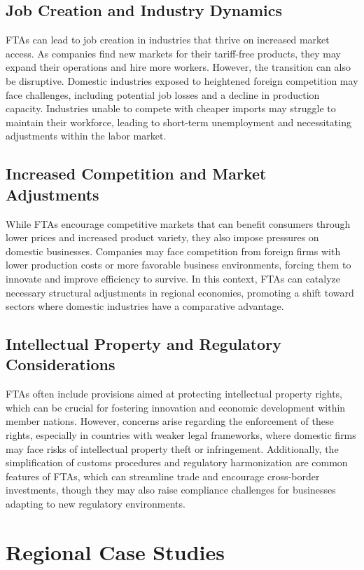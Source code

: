 \documentclass[12pt]{article}
\begin{document}
\subsection{Job Creation and Industry Dynamics}
FTAs can lead to job creation in industries that thrive on increased market access. As companies find new markets for their tariff-free products, they may expand their operations and hire more workers.  However, the transition can also be disruptive. Domestic industries exposed to heightened foreign competition may face challenges, including potential job losses and a decline in production capacity. Industries unable to compete with cheaper imports may struggle to maintain their workforce, leading to short-term unemployment and necessitating adjustments within the labor market.

\subsection{Increased Competition and Market Adjustments}
While FTAs encourage competitive markets that can benefit consumers through lower prices and increased product variety, they also impose pressures on domestic businesses. Companies may face competition from foreign firms with lower production costs or more favorable business environments, forcing them to innovate and improve efficiency to survive. In this context, FTAs can catalyze necessary structural adjustments in regional economies, promoting a shift toward sectors where domestic industries have a comparative advantage.

\subsection{Intellectual Property and Regulatory Considerations}
FTAs often include provisions aimed at protecting intellectual property rights, which can be crucial for fostering innovation and economic development within member nations. However, concerns arise regarding the enforcement of these rights, especially in countries with weaker legal frameworks, where domestic firms may face risks of intellectual property theft or infringement. Additionally, the simplification of customs procedures and regulatory harmonization are common features of FTAs, which can streamline trade and encourage cross-border investments, though they may also raise compliance challenges for businesses adapting to new regulatory environments.

\section{Regional Case Studies}
\end{document}
